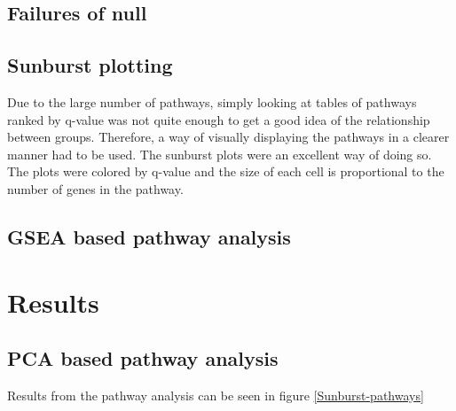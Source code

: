 \documentclass{kththesis}
\begin{document}
     \section{Failures of null}


     \section{Sunburst plotting}
     Due to the large number of pathways, simply looking at tables of pathways ranked by q-value was not quite enough to get a good idea of the relationship between groups. Therefore, a way of visually displaying the pathways in a clearer manner had to be used. The sunburst plots were an excellent way of doing so. The plots were colored by q-value and the size of each cell is proportional to the number of genes in the pathway.



     \section{GSEA based pathway analysis}





\chapter{Results}

     \section{PCA based pathway analysis}
     Results from the pathway analysis can be seen in figure \ref{Sunburst-pathways}
\end{document}
